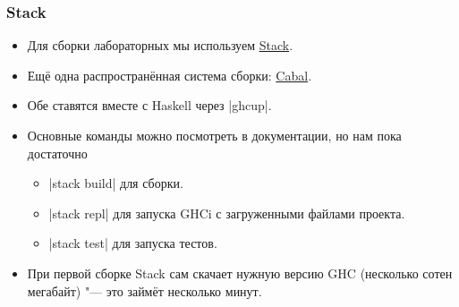 \documentclass[10pt]{beamer}
\begin{document}
\begin{frame}[fragile]
  \frametitle{Stack}
  \begin{itemize}
    \item Для сборки лабораторных мы используем \href{https://docs.haskellstack.org/en/stable/#quick-start-guide}{Stack}.
    \item Ещё одна распространённая система сборки: \href{https://cabal.readthedocs.io/}{Cabal}.
    \item Обе ставятся вместе с Haskell через \ghcinline|ghcup|.
    \item Основные команды можно посмотреть в документации, но нам пока достаточно
          \begin{itemize}
            \item \ghcinline|stack build| для сборки.
            \item \ghcinline|stack repl| для запуска GHCi с загруженными файлами проекта.
            \item \ghcinline|stack test| для запуска тестов.
          \end{itemize}
    \item При первой сборке Stack сам скачает нужную версию GHC (несколько сотен мегабайт) "--- это займёт несколько минут.
  \end{itemize}
\end{frame}
\end{document}
